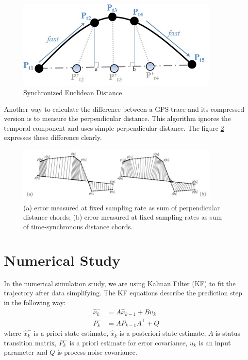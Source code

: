 \begin{figure}[h]
\centering
\includegraphics[width=0.9\textwidth]{Chapters/06Spinoff/plot/sed.jpg}
\caption{Synchronized Euclidean Distance \cite{lawson2011compression}}\label{DataSimpSED}
\end{figure}

Another way to calculate the difference between a GPS trace and its compressed version is to measure the perpendicular distance. This algorithm ignores the temporal component and uses simple perpendicular distance. The figure \ref{DataSimpAB} expresses these difference clearly. 

\begin{figure}[h]
\centering
\includegraphics[width=0.9\textwidth]{Chapters/06Spinoff/plot/ab.JPG}
\caption{(a) error measured at fixed sampling rate as sum of perpendicular distance chords; (b) error measured at fixed sampling rates as sum of time-synchronous distance chords. \cite{meratnia2004spatiotemporal}}\label{DataSimpAB}
\end{figure}


\section{Numerical Study}

In the numerical simulation study, we are using Kalman Filter (KF) to fit the trajectory after data simplifying. The KF equations describe the prediction step in the following way: 
\begin{align*}
\hat{x}_k^-&=A\hat{x}_{k-1}+Bu_k \\
P_k^-&=AP_{k-1}A^\top+Q
\end{align*}
where $\hat{x}_k^-$ is a priori state estimate, $\hat{x}_k$ is a posteriori state estimate, $A$ is status transition matrix, $P_k^-$ is a priori estimate for error covariance, $u_k$ is an input parameter and $Q$ is process noise covariance. 

